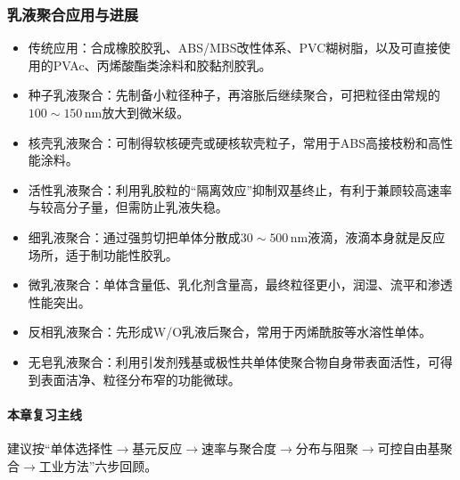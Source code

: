 ﻿\documentclass[12pt,a4paper]{article}
\begin{document}
\subsubsection{乳液聚合应用与进展}
\begin{itemize}
  \item 传统应用：合成橡胶胶乳、ABS/MBS改性体系、PVC糊树脂，以及可直接使用的PVAc、丙烯酸酯类涂料和胶黏剂胶乳。
  \item 种子乳液聚合：先制备小粒径种子，再溶胀后继续聚合，可把粒径由常规的$100\sim150\,\mathrm{nm}$放大到微米级。
  \item 核壳乳液聚合：可制得软核硬壳或硬核软壳粒子，常用于ABS高接枝粉和高性能涂料。
  \item 活性乳液聚合：利用乳胶粒的“隔离效应”抑制双基终止，有利于兼顾较高速率与较高分子量，但需防止乳液失稳。
  \item 细乳液聚合：通过强剪切把单体分散成$30\sim500\,\mathrm{nm}$液滴，液滴本身就是反应场所，适于制功能性胶乳。
  \item 微乳液聚合：单体含量低、乳化剂含量高，最终粒径更小，润湿、流平和渗透性能突出。
  \item 反相乳液聚合：先形成W/O乳液后聚合，常用于丙烯酰胺等水溶性单体。
  \item 无皂乳液聚合：利用引发剂残基或极性共单体使聚合物自身带表面活性，可得到表面洁净、粒径分布窄的功能微球。
\end{itemize}

\paragraph{本章复习主线}
建议按“单体选择性$\rightarrow$基元反应$\rightarrow$速率与聚合度$\rightarrow$分布与阻聚$\rightarrow$可控自由基聚合$\rightarrow$工业方法”六步回顾。
\end{document}
